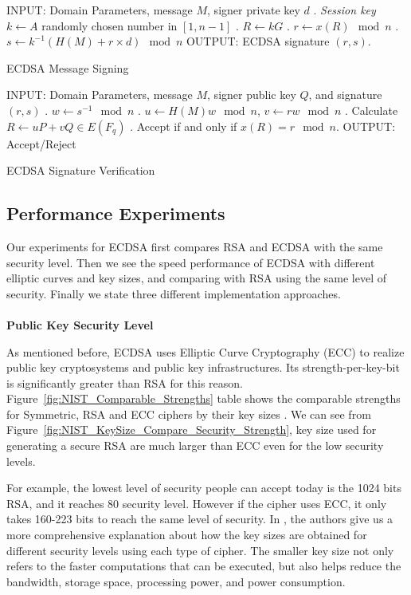 \documentclass[10pt,sigconf]{acmart}
\begin{document}
\begin{algorithm}[H]
\begin{algorithmic}
\STATE INPUT: Domain Parameters, message $M$, signer private key $d$
. \textit{Session key} $k \gets A$ randomly chosen number in $[1,n-1]$
. $R \gets kG$
. $r \gets x(R)\mod n$
. $s \gets k^{-1}(H(M) + r \times d) \mod n$
\STATE OUTPUT: ECDSA signature $(r,s)$.
\end{algorithmic}
\caption{ECDSA Message Signing}
\label{algo:ECDSA_Message_Signing}
\end{algorithm}

\begin{algorithm}[H]
\begin{algorithmic}
\STATE INPUT: Domain Parameters, message $M$, signer public key $Q$, and signature $(r,s)$
. $w \gets s^{-1} \mod n$
. $u \gets H(M)w \mod n$, $v \gets rw \mod n$
. Calculate $R \gets uP + vQ \in E(F_q)$
. Accept if and only if $x(R) = r \mod n$.
\STATE OUTPUT: Accept/Reject
\end{algorithmic}
\caption{ECDSA Signature Verification}
\label{algo:ECDSA_Signature_Verification}
\end{algorithm}

\subsection{Performance Experiments}

Our experiments for ECDSA first compares RSA and ECDSA with the same security level. Then we see the speed performance of ECDSA with different elliptic curves and key sizes, and comparing with RSA using the same level of security. Finally we state three different implementation approaches.
\\
\\
\noindent \textbf{Public Key Security Level}

As mentioned before, ECDSA uses Elliptic Curve Cryptography (ECC) to realize public key cryptosystems and public key infrastructures. Its strength-per-key-bit is significantly  greater than RSA for this reason. Figure~\ref{fig:NIST_Comparable_Strengths} table shows the comparable strengths for Symmetric, RSA and ECC ciphers by their key sizes \cite{nistKeysizes}. We can see from Figure~\ref{fig:NIST_KeySize_Compare_Security_Strength}, key size used for generating a secure RSA are much larger than ECC even for the low security levels. 

For example, the lowest level of security people can accept today is the 1024 bits RSA, and it reaches 80 security level. However if the cipher uses ECC, it only takes 160-223 bits to reach the same level of security. In \cite{lenstra:hal-00925622}, the authors give us a more  comprehensive explanation about how the key sizes are obtained for different security levels using each type of cipher. The smaller key size not only refers to the faster computations that can be executed, but also helps reduce the bandwidth, storage space, processing power, and power consumption.
\end{document}
